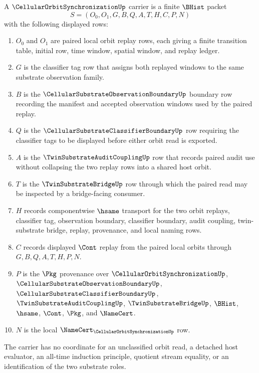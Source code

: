\begin{definition}
\label{def:cellular-orbit-synchronization-carrier}
A $\CellularOrbitSynchronizationUp$ carrier is a finite $\BHist$ packet
$$
S=(O_0,O_1,G,B,Q,A,T,H,C,P,N)
$$
with the following displayed rows:
\begin{enumerate}
\item $O_0$ and $O_1$ are paired local orbit replay rows, each giving a finite transition table, initial row, time window, spatial window, and replay ledger.
\item $G$ is the classifier tag row that assigns both replayed windows to the same substrate observation family.
\item $B$ is the $\CellularSubstrateObservationBoundaryUp$ boundary row recording the manifest and accepted observation windows used by the paired replay.
\item $Q$ is the $\CellularSubstrateClassifierBoundaryUp$ row requiring the classifier tags to be displayed before either orbit read is exported.
\item $A$ is the $\TwinSubstrateAuditCouplingUp$ row that records paired audit use without collapsing the two replay rows into a shared host orbit.
\item $T$ is the $\TwinSubstrateBridgeUp$ row through which the paired read may be inspected by a bridge-facing consumer.
\item $H$ records componentwise $\hsame$ transport for the two orbit replays, classifier tag, observation boundary, classifier boundary, audit coupling, twin-substrate bridge, replay, provenance, and local naming rows.
\item $C$ records displayed $\Cont$ replay from the paired local orbits through $G,B,Q,A,T,H,P,N$.
\item $P$ is the $\Pkg$ provenance over $\CellularOrbitSynchronizationUp$, $\CellularSubstrateObservationBoundaryUp$, $\CellularSubstrateClassifierBoundaryUp$, $\TwinSubstrateAuditCouplingUp$, $\TwinSubstrateBridgeUp$, $\BHist$, $\hsame$, $\Cont$, $\Pkg$, and $\NameCert$.
\item $N$ is the local $\NameCert_{\CellularOrbitSynchronizationUp}$ row.
\end{enumerate}
The carrier has no coordinate for an unclassified orbit read, a detached host evaluator, an all-time induction principle, quotient stream equality, or an identification of the two substrate roles.
\end{definition}

